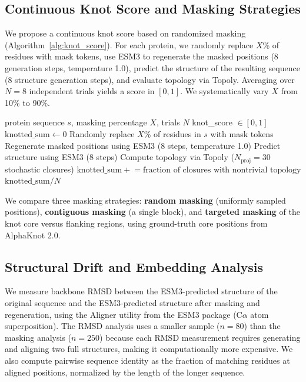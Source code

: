 \documentclass{article}
\begin{document}
\subsection{Continuous Knot Score and Masking Strategies}

We propose a continuous knot score based on randomized masking (Algorithm~\ref{alg:knot_score}). For each protein, we randomly replace $X$\% of residues with mask tokens, use ESM3 to regenerate the masked positions (8 generation steps, temperature 1.0), predict the structure of the resulting sequence (8 structure generation steps), and evaluate topology via Topoly. Averaging over $N=8$ independent trials yields a score in $[0, 1]$. We systematically vary $X$ from 10\% to 90\%.

\begin{algorithm}[tb]
   \caption{Randomized Knot Score Calculation}
   \label{alg:knot_score}
\begin{algorithmic}
    protein sequence $s$, masking percentage $X$, trials $N$
    knot\_score $\in [0, 1]$
   \STATE $\text{knotted\_sum} \leftarrow 0$
   \STATE Randomly replace $X$\% of residues in $s$ with mask tokens
   \STATE Regenerate masked positions using ESM3 (8 steps, temperature 1.0)
   \STATE Predict structure using ESM3 (8 steps)
   \STATE Compute topology via Topoly ($N_{\text{proj}}=30$ stochastic closures)
   \STATE $\text{knotted\_sum} \mathrel{+}= \text{fraction of closures with nontrivial topology}$
   \ENDFOR
    $\text{knotted\_sum} / N$
\end{algorithmic}
\end{algorithm}

We compare three masking strategies: \textbf{random masking} (uniformly sampled positions), \textbf{contiguous masking} (a single block), and \textbf{targeted masking} of the knot core versus flanking regions, using ground-truth core positions from AlphaKnot 2.0.

\subsection{Structural Drift and Embedding Analysis}

We measure backbone RMSD between the ESM3-predicted structure of the original sequence and the ESM3-predicted structure after masking and regeneration, using the Aligner utility from the ESM3 package (C$\alpha$ atom superposition). The RMSD analysis uses a smaller sample ($n=80$) than the masking analysis ($n=250$) because each RMSD measurement requires generating and aligning two full structures, making it computationally more expensive. We also compute pairwise sequence identity as the fraction of matching residues at aligned positions, normalized by the length of the longer sequence.
\end{document}
